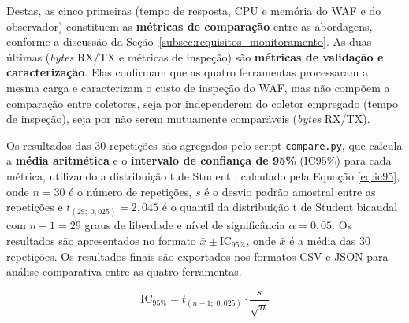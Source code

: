Destas, as cinco primeiras (tempo de resposta, CPU e memória do WAF e do observador) constituem as \textbf{métricas de comparação} entre as abordagens, conforme a discussão da Seção~\ref{subsec:requisitos_monitoramento}. As duas últimas (\textit{bytes} RX/TX e métricas de inspeção) são \textbf{métricas de validação e caracterização}. Elas confirmam que as quatro ferramentas processaram a mesma carga e caracterizam o custo de inspeção do WAF, mas não compõem a comparação entre coletores, seja por independerem do coletor empregado (tempo de inspeção), seja por não serem mutuamente comparáveis (\textit{bytes} RX/TX).

Os resultados das 30 repetições são agregados pelo script \texttt{compare.py}, que calcula a \textbf{média aritmética} e o \textbf{intervalo de confiança de 95\%} (IC95\%) para cada métrica, utilizando a distribuição t de Student \cite{marconi2017}, calculado pela Equação \ref{eq:ic95}, onde $n = 30$ é o número de repetições, $s$ é o desvio padrão amostral entre as repetições e $t_{(29;\;0{,}025)} = 2{,}045$ é o quantil da distribuição t de Student bicaudal com $n - 1 = 29$ graus de liberdade e nível de significância $\alpha = 0{,}05$. Os resultados são apresentados no formato $\bar{x} \pm \text{IC}_{95\%}$, onde $\bar{x}$ é a média das 30 repetições. Os resultados finais são exportados nos formatos CSV e JSON para análise comparativa entre as quatro ferramentas.

\begin{equation}
\text{IC}_{95\%} = t_{(n-1;\;0{,}025)} \cdot \frac{s}{\sqrt{n}}
\label{eq:ic95}
\end{equation}

